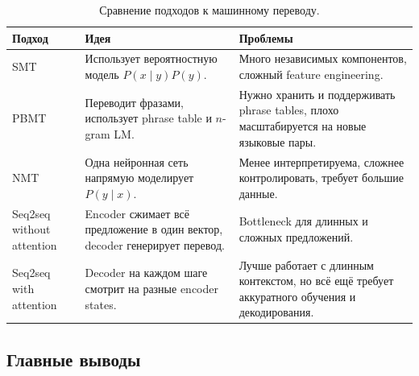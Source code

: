 \documentclass[a4paper,12pt]{article}
\begin{document}
\begin{table}[H]
\centering
\begin{tabular}{p{} p{} p{}}
\toprule
\textbf{Подход} & \textbf{Идея} & \textbf{Проблемы} \\
\midrule

SMT &
Использует вероятностную модель \(P(x \mid y)P(y)\). &
Много независимых компонентов, сложный feature engineering. \\

PBMT &
Переводит фразами, использует phrase table и \(n\)-gram LM. &
Нужно хранить и поддерживать phrase tables, плохо масштабируется на новые языковые пары. \\

NMT &
Одна нейронная сеть напрямую моделирует \(P(y \mid x)\). &
Менее интерпретируема, сложнее контролировать, требует большие данные. \\

Seq2seq without attention &
Encoder сжимает всё предложение в один вектор, decoder генерирует перевод. &
Bottleneck для длинных и сложных предложений. \\

Seq2seq with attention &
Decoder на каждом шаге смотрит на разные encoder states. &
Лучше работает с длинным контекстом, но всё ещё требует аккуратного обучения и декодирования. \\

\bottomrule
\end{tabular}
\caption{Сравнение подходов к машинному переводу.}
\end{table}

\subsection{Главные выводы}
\end{document}
